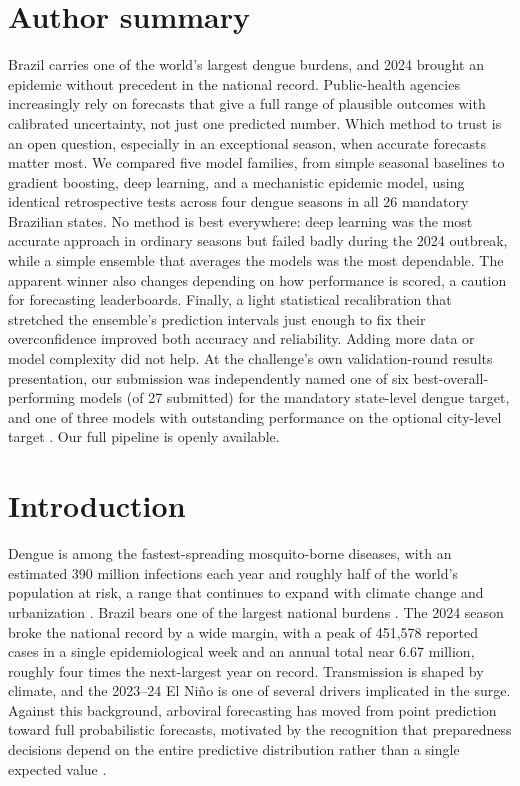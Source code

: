 \documentclass[11pt]{article}
\begin{document}
\section*{Author summary}
\noindent
Brazil carries one of the world's largest dengue burdens, and 2024 brought an epidemic without
precedent in the national record. Public-health agencies increasingly rely on forecasts that give
a full range of plausible outcomes with calibrated uncertainty, not just one predicted number.
Which method to trust is an open question, especially in an exceptional season, when accurate
forecasts matter most. We compared five model families, from simple seasonal baselines to
gradient boosting, deep learning, and a mechanistic epidemic model, using identical retrospective
tests across four dengue seasons in all 26 mandatory Brazilian states. No method is best
everywhere: deep learning was the most accurate approach in ordinary seasons but failed badly during
the 2024 outbreak, while a simple ensemble that averages the models was the most dependable. The
apparent winner also changes depending on how performance is scored, a caution for forecasting
leaderboards. Finally, a light statistical recalibration that stretched the ensemble's prediction
intervals just enough to fix their overconfidence improved both accuracy and reliability. Adding
more data or model complexity did not help. At the challenge's own validation-round results
presentation, our submission was independently named one of six best-overall-performing models (of
27 submitted) for the mandatory state-level dengue target, and one of three models with outstanding
performance on the optional city-level target \citep{imdc2026webinar}. Our full pipeline is openly
available.

\section{Introduction}
Dengue is among the fastest-spreading mosquito-borne diseases, with an estimated 390 million
infections each year and roughly half of the world's population at risk, a range that continues to
expand with climate change and urbanization \citep{bhatt2013,messina2019,colon2021}. Brazil bears one
of the largest national burdens \citep{lowe2021}. The 2024 season broke the national record by a wide
margin, with a peak of 451{,}578 reported cases in a single epidemiological week and an annual total
near 6.67 million, roughly four times the next-largest year on record. Transmission is shaped by
climate, and the 2023--24 El Ni\~no is one of several drivers implicated in the surge. Against this
background, arboviral forecasting has moved from point prediction toward full probabilistic
forecasts, motivated by the recognition that preparedness decisions depend on the entire predictive
distribution rather than a single expected value \citep{gneiting2014,johansson2019,cramer2022}.
\end{document}
